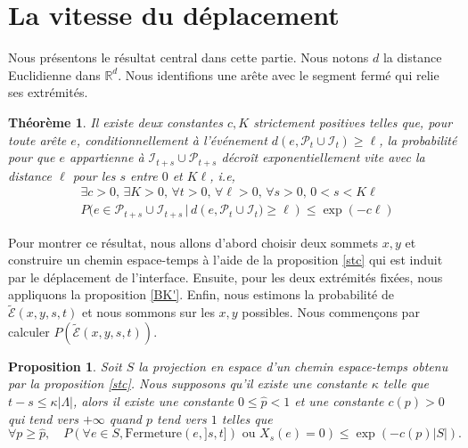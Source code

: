 \documentclass[titlepage,a4paper,12pt]{article}
\newcounter{th}
\newcounter{propo}
\newtheorem{thm}[th]{Théorème}
\newtheorem{prop}[propo]{Proposition}
\begin{document}
\section{La vitesse du déplacement}
Nous présentons le résultat central dans cette partie. Nous notons $d$ la distance Euclidienne dans $\mathbb{R}^d$. Nous identifions une arête avec le segment fermé qui relie ses extrémités.
\begin{thm}\label{vitesse}
Il existe deux constantes $c,K$ strictement positives telles que, pour toute arête $e$, conditionnellement à l'événement $d(e,\mathcal{P}_t\cup\mathcal{I}_t)\geqslant \ell$, la probabilité pour que $e$ appartienne à $\mathcal{I}_{t+s}\cup \mathcal{P}_{t+s}$ décroît exponentiellement vite avec la distance $\ell$ pour les $s$ entre $0$ et $K\ell$, i.e,
\begin{align*}
&\exists c > 0,\,\exists K > 0,\, \forall t>0,\, \forall \ell> 0,\,\forall s> 0,\, 0< s< K\ell\\ &P\big(e\in \mathcal{P}_{t+s}\cup \mathcal{I}_{t+s}\,\big|\,d(e,\mathcal{P}_t\cup \mathcal{I}_t\big) \geqslant \ell)\leqslant \exp(-c\ell)
\end{align*}
\end{thm}
Pour montrer ce résultat, nous allons d'abord choisir deux sommets $x,y$ et construire un chemin espace-temps à l'aide de la proposition \ref{stc} qui est induit par le déplacement de l'interface. Ensuite, pour les deux extrémités fixées, nous appliquons la proposition \ref{BK'}. Enfin, nous estimons la probabilité de $\widetilde{\mathcal{E}}(x,y,s,t)$ et nous sommons sur les $x,y$ possibles. Nous commençons par calculer $P(\widetilde{\mathcal{E}}(x,y,s,t))$. 
\begin{prop} \label{decexp}
Soit $S$ la projection en espace d'un chemin espace-temps obtenu par la proposition \ref{stc}. Nous supposons qu'il existe une constante $\kappa$ telle que $t-s \leqslant \kappa |\Lambda|$, alors il existe une constante $0\leqslant\widehat{p}< 1$ et une constante $c(p)>0$ qui tend vers $+\infty$ quand $p$ tend vers $1$ telles que $$\forall p \geqslant \widehat{p}, \quad P\left(\forall e\in S, \mathrm{Fermeture}(e,]s,t]) \text{ ou }X_s(e) = 0\right)\leqslant \exp(-c(p)|S|).$$
\end{prop}
\end{document}
